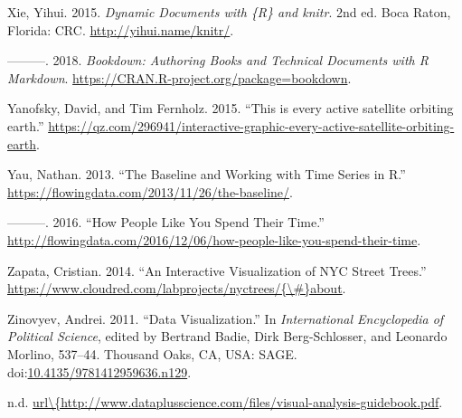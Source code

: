 \documentclass[]{book}
\begin{document}
\hypertarget{ref-xie2015}{}
Xie, Yihui. 2015. \emph{Dynamic Documents with \{R\} and knitr}. 2nd ed.
Boca Raton, Florida: CRC. \url{http://yihui.name/knitr/}.

\hypertarget{ref-R-bookdown}{}
---------. 2018. \emph{Bookdown: Authoring Books and Technical Documents
with R Markdown}. \url{https://CRAN.R-project.org/package=bookdown}.

\hypertarget{ref-Satellite}{}
Yanofsky, David, and Tim Fernholz. 2015. ``This is every active
satellite orbiting earth.''
\url{https://qz.com/296941/interactive-graphic-every-active-satellite-orbiting-earth}.

\hypertarget{ref-baseline_2013}{}
Yau, Nathan. 2013. ``The Baseline and Working with Time Series in R.''
\url{https://flowingdata.com/2013/11/26/the-baseline/}.

\hypertarget{ref-spendingtime}{}
---------. 2016. ``How People Like You Spend Their Time.''
\url{http://flowingdata.com/2016/12/06/how-people-like-you-spend-their-time}.

\hypertarget{ref-trees}{}
Zapata, Cristian. 2014. ``An Interactive Visualization of NYC Street
Trees.''
\href{https://www.cloudred.com/labprojects/nyctrees/\%7B/\#\%7Dabout}{https://www.cloudred.com/labprojects/nyctrees/\{\textbackslash{}\#\}about}.

\hypertarget{ref-poli_social_science}{}
Zinovyev, Andrei. 2011. ``Data Visualization.'' In \emph{International
Encyclopedia of Political Science}, edited by Bertrand Badie, Dirk
Berg-Schlosser, and Leonardo Morlino, 537--44. Thousand Oaks, CA, USA:
SAGE.
doi:\href{https://doi.org/10.4135/9781412959636.n129}{10.4135/9781412959636.n129}.

\hypertarget{ref-dataviz_bestprac}{}
n.d.
\href{url/\%7Bhttp://www.dataplusscience.com/files/visual-analysis-guidebook.pdf}{url\textbackslash{}\{http://www.dataplusscience.com/files/visual-analysis-guidebook.pdf}.
\end{document}

